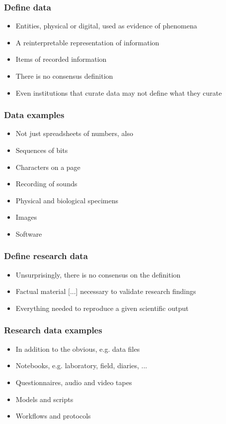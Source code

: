 \documentclass{beamer}
\begin{document}
\begin{frame}
  \frametitle{Define data}
  
  \begin{itemize}
  \item Entities, physical or digital, used as evidence of phenomena \cite{borgman15big}
  \item A reinterpretable representation of information \cite{ccsds12oais}
  \item Items of recorded information
  \item There is no consensus definition
  \item Even institutions that curate data may not define what they curate
  \end{itemize}
\end{frame}

\begin{frame}
  \frametitle{Data examples}
  
  \begin{itemize}
  \item Not just spreadsheets of numbers, also
  \item Sequences of bits
  \item Characters on a page
  \item Recording of sounds
  \item Physical and biological specimens
  \item Images
  \item Software
  \end{itemize}
\end{frame}

\begin{frame}
  \frametitle{Define research data}
  
  \begin{itemize}
  \item Unsurprisingly, there is no consensus on the definition
  \item Factual material [...] necessary to validate research findings \cite{epsrc17researchdata}
  \item Everything needed to reproduce a given scientific output \cite{surkis15researchdata}
  \end{itemize}
\end{frame}

\begin{frame}
  \frametitle{Research data examples}
  
  \begin{itemize}
  \item In addition to the obvious, e.g. data files
  \item Notebooks, e.g. laboratory, field, diaries, ...
  \item Questionnaires, audio and video tapes
  \item Models and scripts
  \item Workflows and protocols
  \end{itemize}
\end{frame}
\end{document}
